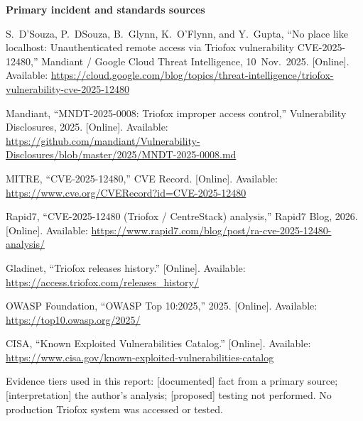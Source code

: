 \documentclass[11pt,a4paper]{article}
\begin{document}
\textbf{Primary incident and standards sources}
\begin{enumerate}[label={[}{\arabic*}{]},leftmargin=2.4em,start=10]
\item S.~D'Souza, P.~DSouza, B.~Glynn, K.~O'Flynn, and Y.~Gupta, ``No place like localhost: Unauthenticated remote access via Triofox vulnerability CVE-2025-12480,'' Mandiant / Google Cloud Threat Intelligence, 10~Nov.\ 2025. [Online]. Available: \url{https://cloud.google.com/blog/topics/threat-intelligence/triofox-vulnerability-cve-2025-12480}
\item Mandiant, ``MNDT-2025-0008: Triofox improper access control,'' Vulnerability Disclosures, 2025. [Online]. Available: \url{https://github.com/mandiant/Vulnerability-Disclosures/blob/master/2025/MNDT-2025-0008.md}
\item MITRE, ``CVE-2025-12480,'' CVE Record. [Online]. Available: \url{https://www.cve.org/CVERecord?id=CVE-2025-12480}
\item Rapid7, ``CVE-2025-12480 (Triofox / CentreStack) analysis,'' Rapid7 Blog, 2026. [Online]. Available: \url{https://www.rapid7.com/blog/post/ra-cve-2025-12480-analysis/}
\item Gladinet, ``Triofox releases history.'' [Online]. Available: \url{https://access.triofox.com/releases_history/}
\item OWASP Foundation, ``OWASP Top 10:2025,'' 2025. [Online]. Available: \url{https://top10.owasp.org/2025/}
\item CISA, ``Known Exploited Vulnerabilities Catalog.'' [Online]. Available: \url{https://www.cisa.gov/known-exploited-vulnerabilities-catalog}
\end{enumerate}

\vspace{4pt}
{\footnotesize\color{meta}Evidence tiers used in this report: \textsf{[documented]} fact from a primary source; \textsf{[interpretation]} the author's analysis; \textsf{[proposed]} testing not performed. No production Triofox system was accessed or tested.}
\end{document}
